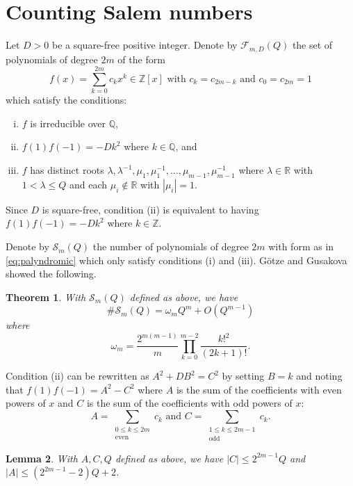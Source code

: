 \documentclass[12pt]{amsart}
\newcommand{\Q}{\mathbb{Q}}
\newcommand{\Z}{\mathbb{Z}}
\newcommand{\R}{\mathbb{R}}
\theoremstyle{plain}
\newtheorem{theorem}{Theorem}[section]
\newtheorem{lemma}[theorem]{Lemma}
\begin{document}
\section{Counting Salem numbers} \label{s:Salem count}

Let $D>0$ be a square-free positive integer. Denote by $\mathcal{F}_{m,D}(Q)$ the set of polynomials of degree $2m$ of the form
\begin{equation}\label{eq:palyndromic}
    f(x)=\sum^{2m}_{k=0} c_k x^k \in\Z[x] \text{ with }c_k=c_{2m-k} \text{ and } c_0=c_{2m}=1 
\end{equation}
which satisfy the conditions:
\begin{enumerate}[(i)]\label{eq:conditions}
    \item $f$ is irreducible over $\Q$, 
    \item $f(1)f(-1)=-D k^2$ where $k\in \Q$, and
    \item $f$ has distinct roots $\lambda,\lambda^{-1},\mu_1,\mu_1^{-1},\dots,\mu_{m-1},\mu_{m-1}^{-1}$ where $\lambda\in\R$ with $1<\lambda\leq Q$ and each $\mu_i\notin\R$ with $|\mu_i|=1$.
\end{enumerate}
Since $D$ is square-free, condition (ii) is equivalent to having $f(1)f(-1)=-D k^2$ where $k\in \Z$.

Denote by $\mathcal{S}_m(Q)$ the number of polynomials of degree $2m$ with form as in \eqref{eq:palyndromic} which only satisfy conditions (i) and (iii). G{\"o}tze and Gusakova showed the following.

\begin{theorem}\cite[Theorem 1.1]{GG20} \label{thm:GG Salem count}
    With $\mathcal{S}_m(Q)$ defined as above, we have \[ \#\mathcal{S}_m(Q) = \omega_{m}Q^m+O(Q^{m-1}) \]
    where
    \[ \omega_m= \frac{2^{m(m-1)}}{m} \prod^{m-2}_{k=0} \frac{k!^2}{(2k+1)!}. \]
\end{theorem}

 
Condition (ii) can be rewritten as $A^2+DB^2=C^2$ by setting $B=k$ and noting that $f(1)f(-1)=A^2-C^2$ where $A$ is the sum of the coefficients with even powers of $x$ and $C$ is the sum of the coefficients with odd powers of $x$:
\begin{equation}\label{eq:defAB}
 A=\sum_{\substack{0\leq k\leq 2m \\ \text{even}}} c_k \text{ and } C=\sum_{\substack{1\leq k\leq 2m-1 \\ \text{odd}}} c_k.    
\end{equation}


\begin{lemma} \label{lem:ACbounds}
With $A, C, Q$ defined as above, we have $|C| \leq 2^{2m-1} Q $ and \\ $ |A |\leq (2^{2m-1}-2) Q +2$.
\end{lemma}
\end{document}
